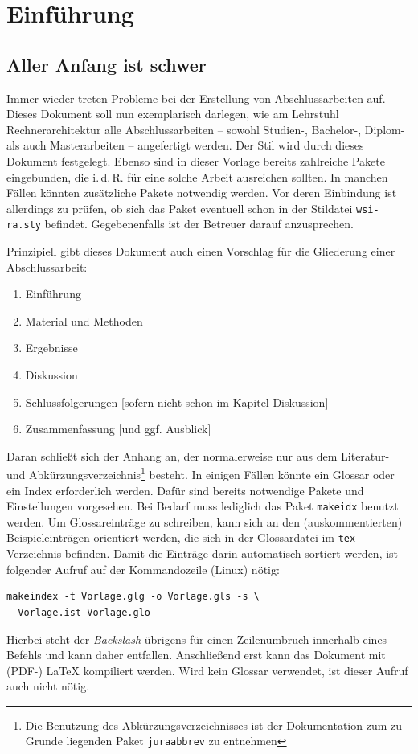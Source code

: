 \chapter{Einführung}

\section{Aller Anfang ist schwer}

Immer wieder treten Probleme bei der Erstellung von Abschlussarbeiten auf.
Dieses Dokument soll nun exemplarisch darlegen, wie am Lehrstuhl
Rechnerarchitektur alle Abschlussarbeiten -- sowohl Studien-, Bachelor-, Diplom-
als auch Masterarbeiten -- angefertigt werden. Der Stil wird durch dieses
Dokument festgelegt. Ebenso sind in dieser Vorlage bereits zahlreiche Pakete
eingebunden, die i.\,d.\,R. für eine solche Arbeit ausreichen sollten. In
manchen Fällen könnten zusätzliche Pakete notwendig werden. Vor deren Einbindung
ist allerdings zu prüfen, ob sich das Paket eventuell schon in der Stildatei
\texttt{wsi-ra.sty} befindet. Gegebenenfalls ist der Betreuer darauf
anzusprechen.

Prinzipiell gibt dieses Dokument auch einen Vorschlag für die Gliederung einer
Abschlussarbeit:
\begin{enumerate}
\item Einführung
\item Material und Methoden
\item Ergebnisse
\item Diskussion
\item Schlussfolgerungen [sofern nicht schon im Kapitel Diskussion]
\item Zusammenfassung [und ggf. Ausblick]
\end{enumerate}
Daran schließt sich der Anhang an, der normalerweise nur aus dem Literatur- und
Abkürzungsverzeichnis\footnote{Die Benutzung des Abkürzungsverzeichnisses ist
der Dokumentation zum zu Grunde liegenden Paket \texttt{juraabbrev} zu
entnehmen} besteht. In einigen Fällen könnte ein Glossar oder ein Index
erforderlich werden. Dafür sind bereits notwendige Pakete und Einstellungen
vorgesehen. Bei Bedarf muss lediglich das Paket \texttt{makeidx} benutzt
werden. Um Glossareinträge zu schreiben, kann sich an den (auskommentierten)
Beispieleinträgen orientiert werden, die sich in der Glossardatei im
\texttt{tex}-Verzeichnis befinden. Damit die Einträge darin automatisch
sortiert werden, ist folgender Aufruf auf der Kommandozeile (Linux) nötig:
\begin{verbatim}
makeindex -t Vorlage.glg -o Vorlage.gls -s \
  Vorlage.ist Vorlage.glo
\end{verbatim}
Hierbei steht der \emph{Backslash} übrigens für einen Zeilenumbruch innerhalb
eines Befehls und kann daher entfallen. Anschließend erst kann das Dokument mit
(PDF-) \LaTeX{} kompiliert werden. Wird kein Glossar verwendet, ist dieser
Aufruf auch nicht nötig.

